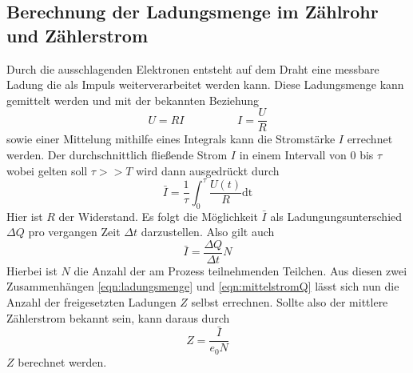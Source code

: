 \subsection{Berechnung der Ladungsmenge im Zählrohr und Zählerstrom}
Durch die ausschlagenden Elektronen entsteht auf dem Draht eine messbare Ladung die als Impuls weiterverarbeitet werden kann.
Diese Ladungsmenge kann gemittelt werden und mit der bekannten Beziehung
\begin{equation*}
U=RI \hspace{2cm} I=\frac{U}{R}
\end{equation*}
sowie einer Mittelung mithilfe eines Integrals kann die Stromstärke $I$ errechnet werden.
Der durchschnittlich fließende Strom $I$ in einem Intervall von $0$ bis $\tau$ wobei gelten soll $\tau>>T$ wird dann ausgedrückt durch
\begin{equation}
\label{eqn:ladungsmenge}
\bar{\si{I}} = \frac{1}{\tau} \int_{0}^{\tau} \frac{U(t)}{R} \text{dt}
\end{equation}
Hier ist $R$ der Widerstand. 
Es folgt die Möglichkeit $\bar{\si{I}}$ als Ladungungsunterschied $\Delta \si{Q}$ pro vergangen Zeit $\Delta \si{t}$ darzustellen. 
Also gilt auch
\begin{equation}
\label{eqn:mittelstromQ}
\bar{\si{I}} = \frac{\Delta \si{Q}}{\Delta\si{t}}\si{N}
\end{equation}  
Hierbei ist $\si{N}$ die Anzahl der am Prozess teilnehmenden Teilchen.
Aus diesen zwei Zusammenhängen \eqref{eqn:ladungsmenge} und \eqref{eqn:mittelstromQ} lässt sich nun die Anzahl der freigesetzten Ladungen $\si{Z}$
selbst errechnen. Sollte also der mittlere Zählerstrom bekannt sein, kann daraus durch 
\begin{equation}
\label{eqn:teilchen}
\si{Z} = \frac{\bar{\si{I}}}{e_0N}
\end{equation}
$\si{Z}$ berechnet werden.


